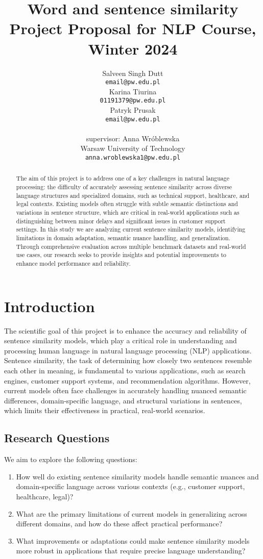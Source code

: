 \documentclass[11pt]{article}
\title{Word and sentence similarity\\Project Proposal for NLP Course, Winter 2024}
\author{Salveen Singh Dutt \\
  {\tt email@pw.edu.pl} \\\And
  Karina Tiurina \\
  {\tt 01191379@pw.edu.pl} \\ \And 
  Patryk Prusak \\
  {\tt email@pw.edu.pl} \\ \\ 
  supervisor: Anna Wróblewska\\
  Warsaw University of Technology \\
  {\tt anna.wroblewska1@pw.edu.pl}}
\date{}
\begin{document}
\maketitle
\begin{abstract}
  The aim of this project is to address one of a key challenges in natural language processing: the difficulty of accurately assessing sentence similarity across diverse language structures and specialized domains, such as technical support, healthcare, and legal contexts. Existing models often struggle with subtle semantic distinctions and variations in sentence structure, which are critical in real-world applications such as distinguishing between minor delays and significant issues in customer support settings. In this study we are analyzing current sentence similarity models, identifying limitations in domain adaptation, semantic nuance handling, and generalization. Through comprehensive evaluation across multiple benchmark datasets and real-world use cases, our research seeks to provide insights and potential improvements to enhance model performance and reliability.
\end{abstract}

\section{Introduction}
The scientific goal of this project is to enhance the accuracy and reliability of sentence similarity models, which play a critical role in understanding and processing human language in natural language processing (NLP) applications. Sentence similarity, the task of determining how closely two sentences resemble each other in meaning, is fundamental to various applications, such as search engines, customer support systems, and recommendation algorithms. However, current models often face challenges in accurately handling nuanced semantic differences, domain-specific language, and structural variations in sentences, which limits their effectiveness in practical, real-world scenarios.

\subsection{Research Questions}
We aim to explore the following questions:
\begin{enumerate}
    \item How well do existing sentence similarity models handle semantic nuances and domain-specific language across various contexts (e.g., customer support, healthcare, legal)?
    \item What are the primary limitations of current models in generalizing across different domains, and how do these affect practical performance?
    \item What improvements or adaptations could make sentence similarity models more robust in applications that require precise language understanding?
\end{enumerate}
\end{document}
